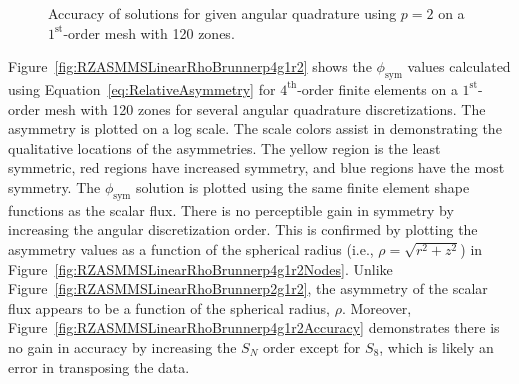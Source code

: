 \documentclass[12pt]{article}
\begin{document}
\begin{figure}[!htb]
\centering
{}
\caption{Accuracy of solutions for given angular quadrature using $p=2$ on a $1^\text{st}$-order mesh with 120 zones.}
\label{fig:RZASMMSLinearRhoBrunnerp2g1r2Accuracy}
\end{figure}

\FloatBarrier

Figure~\ref{fig:RZASMMSLinearRhoBrunnerp4g1r2} shows the $\phi_\text{sym}$ values calculated using Equation~\ref{eq:RelativeAsymmetry} for $4^\text{th}$-order finite elements on a $1^\text{st}$-order mesh with 120 zones for several angular quadrature discretizations. The asymmetry is plotted on a log scale. The scale colors assist in demonstrating the qualitative locations of the asymmetries. The yellow region is the least symmetric, red regions have increased symmetry, and blue regions have the most symmetry. The $\phi_\text{sym}$ solution is plotted using the same finite element shape functions as the scalar flux. There is no perceptible gain in symmetry by increasing the angular discretization order. This is confirmed by plotting the asymmetry values as a function of the spherical radius (i.e., $\rho=\sqrt{r^2+z^2}$) in Figure~\ref{fig:RZASMMSLinearRhoBrunnerp4g1r2Nodes}. Unlike Figure~\ref{fig:RZASMMSLinearRhoBrunnerp2g1r2}, the asymmetry of the scalar flux appears to be a function of the spherical radius, $\rho$. Moreover, Figure~\ref{fig:RZASMMSLinearRhoBrunnerp4g1r2Accuracy} demonstrates there is no gain in accuracy by increasing the $S_N$ order except for $S_8$, which is likely an error in transposing the data.
\end{document}
